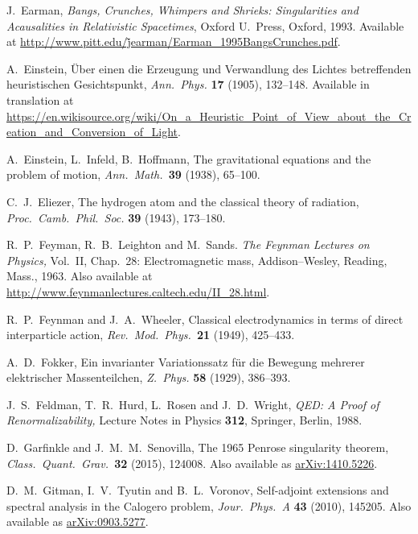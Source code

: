\documentclass{article}
\begin{document}
\begin{thebibliography}{10}
 J.\ Earman, \textsl{Bangs, Crunches, Whimpers and Shrieks: Singularities and Acausalities in Relativistic Spacetimes}, Oxford U.\ Press, Oxford,
1993.  Available at \href{http://www.pitt.edu/~jearman/Earman_1995BangsCrunches.pdf}{http://www.pitt.edu/\~jearman/Earman\_1995BangsCrunches.pdf}.

 A.\ Einstein, \"Uber einen die Erzeugung und Verwandlung des Lichtes betreffenden heuristischen Gesichtspunkt, \textsl{Ann.\ Phys.} \textbf{17} (1905), 132--148.  Available in translation at \href{https://en.wikisource.org/wiki/On_a_Heuristic_Point_of_View_about_the_Creation_and_Conversion_of_Light}{https://en.wikisource.org/wiki/On\_a\_Heuristic\_Point\_of\_View\_about\_the\_\break Creation\_and\_Conversion\_of\_Light}.

 A.\ Einstein, L.\ Infeld, B.\ Hoffmann, The gravitational equations and the problem of motion, \textsl{Ann.\ Math.\ }\textbf{39} (1938), 65--100.

 C.\ J.\ Eliezer, The hydrogen atom and the classical theory of
radiation, \textsl{Proc.\ Camb.\ Phil.\ Soc.} \textbf{39} (1943), 173--180.

 R.\ P.\ Feyman, R.\ B.\ Leighton and M.\ Sands. 
\textsl{The Feynman Lectures on Physics,} Vol.\ II, Chap.\ 28: Electromagnetic mass, Addison--Wesley, Reading, Mass., 1963.  Also available at \href{http://www.feynmanlectures.caltech.edu/II_28.html}
{http://www.feynmanlectures.caltech.edu/II\_28.html}.

 R.\ P.\ Feynman and J.\ A.\ Wheeler, 
Classical electrodynamics in terms of direct interparticle action, \textsl{Rev.\ Mod.\
Phys.\ }\textbf{21} (1949), 425--433.  
 
 A.\ D.\ Fokker, Ein invarianter Variationssatz f\"ur die Bewegung mehrerer elektrischer Massenteilchen, \textsl{Z.\ Phys.} \textbf{58} (1929), 386--393.

 J.\ S.\ Feldman, T.\ R.\ Hurd, L.\ Rosen and J.\ D.\ Wright, \textsl{QED: A Proof of Renormalizability,} Lecture Notes in Physics \textbf{312}, Springer, Berlin, 1988.

 D.\ Garfinkle and J.\ M.\ M.\ Senovilla, The 1965 Penrose singularity theorem, \textsl{Class.\ Quant.\ Grav.\ }\textbf{32} (2015), 124008.  Also available as \href{http://arxiv.org/abs/1410.5226}{arXiv:1410.5226}.

 D.\ M.\ Gitman, I.\ V.\ Tyutin and B.\ L.\ Voronov, Self-adjoint extensions and spectral analysis in the Calogero problem,  \textsl{Jour.\ Phys.\ A} \textbf{43} (2010), 145205. Also available as \href{http://arxiv.org/abs/0903.5277}{arXiv:0903.5277}.


\end{thebibliography}
\end{document}
